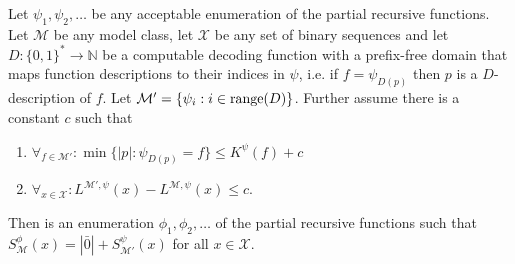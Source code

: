 \documentclass{style/llncs}
\newcommand{\M}{\mathcal M}
\newcommand{\X}{\mathcal X}
\newcommand{\N}{\mathbb N}
\newcommand{\tn}[1]{\textnormal{#1}}
\begin{document}
\begin{lemma}\label{lem:thecoolone}
  Let $\psi_1,\psi_2,\ldots$ be any acceptable enumeration of the partial recursive functions.
  Let $\M$ be any model class, let $\X$ be any set of binary sequences and let $D:\{0,1\}^*\to\N$ be a computable decoding function with a prefix-free domain that maps function descriptions to their indices in $\psi$, i.e. if $f=\psi_{D(p)}$ then $p$ is a $D$-description of $f$. Let $\M'=\{\psi_i:i\in\tn{range}(D)\}$. Further assume there is a constant $c$ such that
\begin{enumerate}
  \item $\forall_{f\in\M'}:\min\{|p|:\psi_{D(p)}=f\}\le K^\psi(f)+c$
  \item $\forall_{x\in\X}:L^{\M',\psi}(x)-L^{\M,\psi}(x)\le c$.
\end{enumerate}
Then is an enumeration $\phi_1,\phi_2,\ldots$ of the partial recursive functions such that $S^\phi_{\M}(x) = |\bar 0|+S^\psi_{\M'}(x)$ for all $x\in\X$.
\end{lemma}
\end{document}

